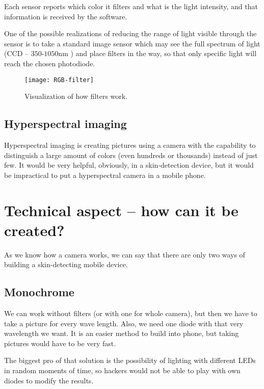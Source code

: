             Each sensor reports which color it filters and what is the light intensity,
            and that information is received by the software.

            One of the possible realizations of reducing the range
            of light visible through the sensor is to take a standard image sensor which
            may see the full spectrum of light (CCD -- $350$-$1050$nm
            \cite{imagesensorsmax}) and place filters
            in the way, so that only specific light will reach the chosen photodiode.

            \begin{figure}[H]
                \caption{Visualization of how filters work.}
                \centering
                \texttt{[image: RGB-filter]}
                \label{fig:RGB-filter}
            \end{figure}

        \subsection*{Hyperspectral imaging}
            Hyperspectral imaging is creating pictures using a camera with the
            capability to distinguish a large amount of colors
            (even hundreds or thousands) instead of just few.
            It would be very helpful, obviously, in a skin-detection device,
            but it would be impractical to put a hyperspectral camera in a mobile phone.

    \section{Technical aspect -- how can it be created?}
        As we know how a camera works, we can say that there are only two ways of
        building a skin-detecting mobile device.
        \subsection*{Monochrome}
            We can work without filters (or with one for whole camera),
            but then we have to take a picture for every wave length.
            Also, we need one diode with that very wavelength we want.
            It is an easier method to build into phone, but taking pictures
            would have to be very fast.

            The biggest pro of that solution is the possibility of lighting
            with different LEDs in random moments of time, so hackers
            would not be able to play with own diodes to modify the results.

